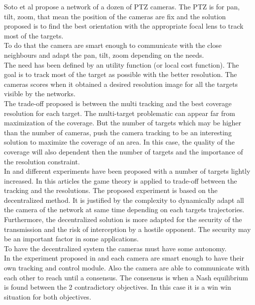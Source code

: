 Soto et al \cite{12*soto2009} propose a network of a dozen of PTZ cameras. The PTZ is for pan, tilt, zoom, that mean the position of the cameras are fix and the solution proposed is to find the best orientation with the appropriate focal lens to track most of the targets.  \\
 To do that the camera are smart enough to communicate with the close neighbours and adapt the pan, tilt, zoom depending on the needs.\\
The need has been defined by an utility function (or local cost function). The goal is to track most of the target as possible with the better resolution. The cameras scores when it obtained a desired resolution image for all the targets visible by the networks.\\
The trade-off proposed is between the multi tracking and the best coverage resolution for each target. The multi-target problematic can appear far from maximization of the coverage. But the number of targets which may be higher than the number of cameras, push the camera tracking to be an interesting solution to maximize the coverage of an area. In this case, the quality of the coverage will also dependent then the number of targets and the importance of the resolution constraint.  \\
	 In \cite{18*ding2012} and \cite{25*song2008} different experiments have been proposed with a number of targets  lightly increased. In this articles the game theory is applied to trade-off between the tracking and the resolutions. The proposed experiment is based on the decentralized method. It is justified by the complexity to dynamically adapt all the camera of the network at same time depending on each targets trajectories.\\
	  Furthermore, the decentralized solution is more adapted for the security of the transmission and the risk of interception by a hostile opponent. The security may be an important factor in some applications. \\
To have the decentralized system the cameras must have some autonomy. \\
In the experiment proposed in \cite{12*soto2009} and \cite{18*ding2012,25*song2008} each camera are smart enough to have their own tracking and control module. Also the camera are able to communicate with each other to reach until a consensus. The consensus is when a Nash equilibrium is found between the 2 contradictory objectives. In this case it is a win win situation for both objectives.\\
